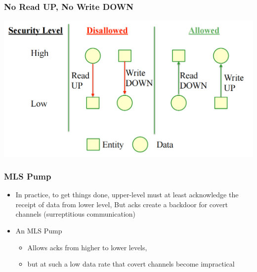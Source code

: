 \documentclass[12pt]{article}
\begin{document}
\subsubsection{No Read UP, No Write DOWN}
\includegraphics[width=\textwidth]{NoReadUPNoWriteDOWN.png}
\subsubsection{MLS Pump}
\begin{itemize}
    \item In practice, to get things done, upper-level must at least acknowledge the receipt of data from lower level, But acks create a backdoor for covert channels (surreptitious communication)
    \item An MLS Pump \begin{itemize}
        \item Allows acks from higher to lower levels, 
        \item but at such a low data rate that covert channels become impractical
    \end{itemize}
\end{itemize}
\end{document}

